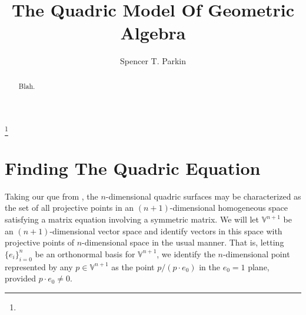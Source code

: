 \documentclass{ecgd-l}
\theoremstyle{definition}
\theoremstyle{remark}
\numberwithin{equation}{section}
\newcommand{\V}{\mathbb{V}}
\begin{document}
\title{The Quadric Model Of Geometric Algebra}


\author{Spencer T. Parkin}
\address{}
\curraddr{}
\thanks{}



\date{}

\dedicatory{}

\begin{abstract}
Blah.
\end{abstract}

\maketitle


\nocite{DoranHestenes93}
\nocite{WikipediaQuadricEntry}

\section{Finding The Quadric Equation}

Taking our que from \cite{WikipediaQuadricEntry}, the $n$-dimensional quadric surfaces
may be characterized as the set of all projective points in an $(n+1)$-dimensional homogeneous space
satisfying a matrix equation involving a symmetric matrix.  We will let $\V^{n+1}$ be an
$(n+1)$-dimensional vector space and identify vectors in this space with projective
points of $n$-dimensional space in the usual manner.  That is, letting $\{e_i\}_{i=0}^n$
be an orthonormal basis for $\V^{n+1}$, we identify the $n$-dimensional point
represented by any $p\in\V^{n+1}$ as the point $p/(p\cdot e_0)$ in the $e_0=1$ plane,
provided $p\cdot e_0\neq 0$.
\end{document}
